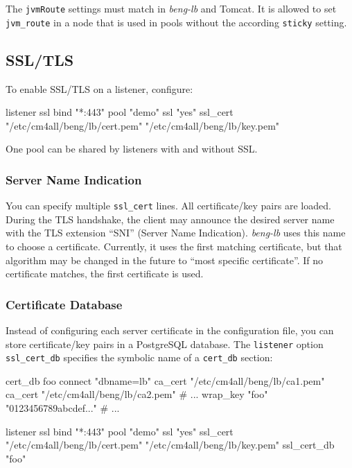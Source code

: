 \documentclass[a4paper,12pt]{article}
\begin{document}
The \verb|jvmRoute| settings must match in \emph{beng-lb} and Tomcat.
It is allowed to set \verb|jvm_route| in a node that is used in pools
without the according \verb|sticky| setting.

\subsection{SSL/TLS}
\label{ssl}

To enable SSL/TLS on a listener, configure:

\begin{verbatim*}
listener ssl {
  bind "*:443"
  pool "demo"
  ssl "yes"
  ssl_cert "/etc/cm4all/beng/lb/cert.pem" "/etc/cm4all/beng/lb/key.pem"
}
\end{verbatim*}

One pool can be shared by listeners with and without SSL.

\subsubsection{Server Name Indication}

You can specify multiple \verb|ssl_cert| lines.  All certificate/key
pairs are loaded.  During the TLS handshake, the client may announce
the desired server name with the TLS extension ``SNI'' (Server Name
Indication).  \emph{beng-lb} uses this name to choose a certificate.
Currently, it uses the first matching certificate, but that algorithm
may be changed in the future to ``most specific certificate''.  If no
certificate matches, the first certificate is used.

\subsubsection{Certificate Database}
\label{certdbconfig}

Instead of configuring each server certificate in the configuration
file, you can store certificate/key pairs in a PostgreSQL database.
The \texttt{listener} option \verb|ssl_cert_db| specifies the symbolic
name of a \verb|cert_db| section:

\begin{verbatim*}
cert_db foo {
  connect "dbname=lb"
  ca_cert "/etc/cm4all/beng/lb/ca1.pem"
  ca_cert "/etc/cm4all/beng/lb/ca2.pem"
  # ...
  wrap_key "foo" "0123456789abcdef..."
  # ...
}

listener ssl {
  bind "*:443"
  pool "demo"
  ssl "yes"
  ssl_cert "/etc/cm4all/beng/lb/cert.pem" "/etc/cm4all/beng/lb/key.pem"
  ssl_cert_db "foo"
}
\end{verbatim*}
\end{document}

